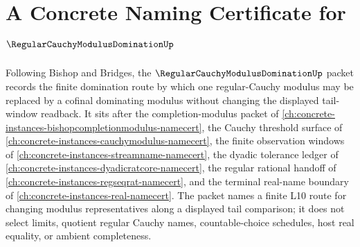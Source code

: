 \chapter{A Concrete Naming Certificate for $\RegularCauchyModulusDominationUp$}
\label{ch:concrete-instances-regular-cauchy-modulus-domination-namecert}

Following Bishop and Bridges, the $\RegularCauchyModulusDominationUp$ packet records the finite domination route by which one regular-Cauchy modulus may be replaced by a cofinal dominating modulus without changing the displayed tail-window readback. It sits after the completion-modulus packet of \autoref{ch:concrete-instances-bishopcompletionmodulus-namecert}, the Cauchy threshold surface of \autoref{ch:concrete-instances-cauchymodulus-namecert}, the finite observation windows of \autoref{ch:concrete-instances-streamname-namecert}, the dyadic tolerance ledger of \autoref{ch:concrete-instances-dyadicratcore-namecert}, the regular rational handoff of \autoref{ch:concrete-instances-regseqrat-namecert}, and the terminal real-name boundary of \autoref{ch:concrete-instances-real-namecert}. The packet names a finite L10 route for changing modulus representatives along a displayed tail comparison; it does not select limits, quotient regular Cauchy names, countable-choice schedules, host real equality, or ambient completeness.

